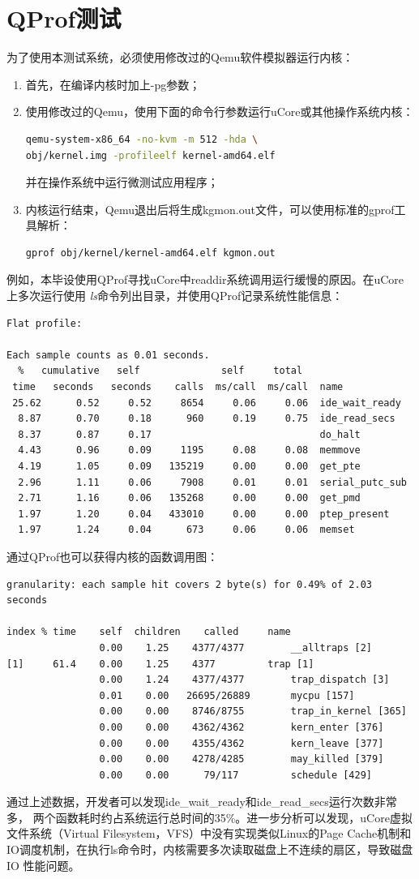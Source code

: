 \section{QProf测试}
为了使用本测试系统，必须使用修改过的Qemu软件模拟器运行内核：
\begin{enumerate}
	\item 首先，在编译内核时加上-pg参数；
	\item
		使用修改过的Qemu，使用下面的命令行参数运行uCore或其他操作系统内核：
		\begin{lstlisting}[language=sh]
qemu-system-x86_64 -no-kvm -m 512 -hda \
obj/kernel.img -profileelf kernel-amd64.elf
		\end{lstlisting}

		并在操作系统中运行微测试应用程序；
	\item
		内核运行结束，Qemu退出后将生成kgmon.out文件，可以使用标准的gprof工具解析：
		\begin{lstlisting}[language=sh]
gprof obj/kernel/kernel-amd64.elf kgmon.out
		\end{lstlisting}

\end{enumerate}

	例如，本毕设使用QProf寻找uCore中readdir系统调用运行缓慢的原因。在uCore上多次运行使用
	\emph{ls}命令列出目录，并使用QProf记录系统性能信息：
	{\tiny
	\begin{Verbatim}[frame=single]
Flat profile:

Each sample counts as 0.01 seconds.
  %   cumulative   self              self     total
 time   seconds   seconds    calls  ms/call  ms/call  name
 25.62      0.52     0.52     8654     0.06     0.06  ide_wait_ready
  8.87      0.70     0.18      960     0.19     0.75  ide_read_secs
  8.37      0.87     0.17                             do_halt
  4.43      0.96     0.09     1195     0.08     0.08  memmove
  4.19      1.05     0.09   135219     0.00     0.00  get_pte
  2.96      1.11     0.06     7908     0.01     0.01  serial_putc_sub
  2.71      1.16     0.06   135268     0.00     0.00  get_pmd
  1.97      1.20     0.04   433010     0.00     0.00  ptep_present
  1.97      1.24     0.04      673     0.06     0.06  memset
	\end{Verbatim}
	}

	通过QProf也可以获得内核的函数调用图：

	{\tiny
	\begin{Verbatim}[frame=single]
granularity: each sample hit covers 2 byte(s) for 0.49% of 2.03 seconds

index % time    self  children    called     name
                0.00    1.25    4377/4377        __alltraps [2]
[1]     61.4    0.00    1.25    4377         trap [1]
                0.00    1.24    4377/4377        trap_dispatch [3]
                0.01    0.00   26695/26889       mycpu [157]
                0.00    0.00    8746/8755        trap_in_kernel [365]
                0.00    0.00    4362/4362        kern_enter [376]
                0.00    0.00    4355/4362        kern_leave [377]
                0.00    0.00    4278/4285        may_killed [379]
                0.00    0.00      79/117         schedule [429]
	\end{Verbatim}
	}

	通过上述数据，开发者可以发现ide\_wait\_ready和ide\_read\_secs运行次数非常多，
两个函数耗时约占系统运行总时间的35\%。进一步分析可以发现，uCore虚拟文件系统（Virtual
Filesystem，VFS）中没有实现类似Linux的Page
Cache机制和IO调度机制，在执行ls命令时，内核需要多次读取磁盘上不连续的扇区，导致磁盘IO
性能问题。

